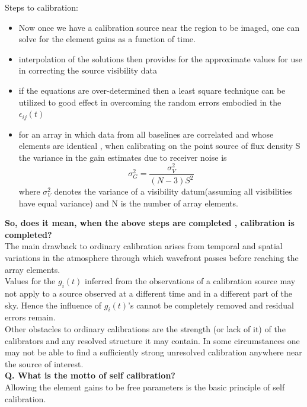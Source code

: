 \documentclass[10pt]{report}
\newcommand{\tbf}[1]{\textbf{#1}}
\begin{document}
Steps to calibration:
\begin{itemize}
\item Now once we have a calibration source near the region to be imaged, one can solve for the element gains as a function of time.
\item interpolation of the solutions then provides for the approximate values for use in correcting the source visibility data
\item if the equations are over-determined then a least square technique can be utilized to good effect in overcoming the random errors embodied in the $\epsilon_{ij}(t)$
\item for an array in which data from all baselines are correlated and whose elements are identical , when calibrating on the point source of flux density S the variance in the gain estimates due to receiver noise is
\begin{equation}
\sigma^2_G=\frac{\sigma^2_V}{(N-3)S^2}
\end{equation}
where $\sigma^2_V$ denotes the variance of a visibility datum(assuming all visibilities have equal variance) and N is the number of array elements.
\end{itemize}

\tbf{ So, does it mean, when the above steps are completed , calibration is completed?}\\

The main drawback to ordinary calibration arises from temporal and spatial variations in the atmosphere through which wavefront passes before reaching the array elements.\\

Values for the $g_i(t)$ inferred from the observations of a calibration source may not apply to a source observed at a different time and in a different part of the sky. Hence the influence of $g_i(t)$'s cannot be completely removed and residual errors remain.\\

Other obstacles to ordinary calibrations are the strength (or lack of it) of the calibrators and any resolved structure it may contain. In some circumstances one may not be able to find a sufficiently strong unresolved calibration anywhere near the source of interest.\\

\tbf{Q. What is the motto of self calibration?}\\

Allowing the element gains to be free parameters is the basic principle of self calibration.
\end{document}
